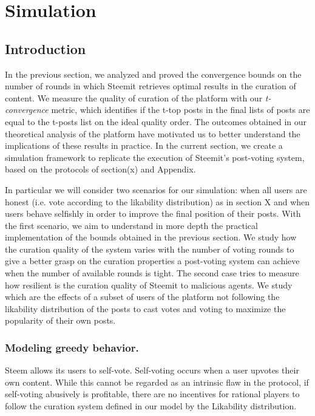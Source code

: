 
\section{Simulation}

\subsection{Introduction}

In the previous section, we analyzed and proved the convergence bounds on the number of rounds in which Steemit retrieves optimal results in the curation of content.
We measure the quality of curation of the platform with our \textit{t-convergence} metric, which identifies if the t-top posts in the final lists of posts are equal to the t-posts list on the ideal quality order.
The outcomes obtained in our theoretical analysis of the platform have motivated us to better understand the implications of these results in practice. In the current section, we create a simulation framework to replicate the execution of Steemit's post-voting system, based on the protocols of section(x) and Appendix.

In particular we will consider two scenarios for our simulation: when all users are honest (i.e. vote according to the likability distribution) as in section X and when users behave selfishly in order to improve the final position of their posts.
With the first scenario, we aim to understand in more depth the practical implementation of the bounds obtained in the previous section. We study how the curation quality of the system varies with the number of voting rounds to give a better grasp on the curation properties a post-voting system can achieve when the number of available rounds is tight.
The second case tries to measure how resilient is the curation quality of Steemit to malicious agents. We study which are the effects of a subset of users of the platform not following the likability distribution of the posts to cast votes and voting to maximize the popularity of their own posts.

\subsubsection*{Modeling greedy behavior.}

Steem allows its users to self-vote. 
Self-voting occurs when a user upvotes their own content. While this cannot be regarded as an intrinsic flaw in the protocol, if self-voting abusively is profitable, there are no incentives for rational players to follow the
curation system defined in our model by the Likability distribution.

